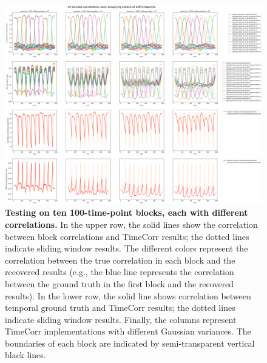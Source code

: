 \documentclass[11pt]{article}
\begin{document}
\begin{figure}[!htb]
\includegraphics[width=1\textwidth]{../figures/SyntheticTesting/10block100t.png}
\caption{\textbf{Testing on ten 100-time-point blocks, each with different correlations.} In the upper row, the solid lines show the correlation between block correlations and TimeCorr results; the dotted lines indicate sliding window results. The different colors represent the correlation between the true correlation in each block and the recovered results (e.g., the blue line represents the correlation between the ground truth in the first block and the recovered results). In the lower row, the solid line shows correlation between temporal ground truth and TimeCorr results; the dotted lines indicate sliding window results. Finally, the columns represent TimeCorr implementations with different Gaussian variances. The boundaries of each block are indicated by semi-transparent vertical black lines.}
\label{fig:10block100t}
\end{figure}
\end{document}
